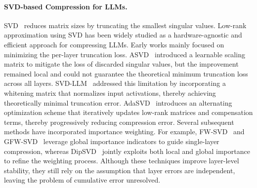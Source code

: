 \paragraph{SVD-based Compression for LLMs.}
SVD~\citep{Golub1987Generalization} reduces matrix sizes by truncating the smallest singular values. 
Low-rank approximation using SVD has been widely studied as a hardware-agnostic and efficient approach for compressing LLMs.
%
Early works mainly focused on minimizing the per-layer truncation loss.
ASVD~\citep{yuan2023asvd} introduced a learnable scaling matrix to mitigate the loss of discarded singular values, but the improvement remained local and could not guarantee the theoretical minimum truncation loss across all layers. SVD-LLM~\citep{Wang2024SVD-LLM,Wang2025SVD-LLM-V2} addressed this limitation by incorporating a whitening matrix that normalizes input activations, thereby achieving theoretically minimal truncation error. AdaSVD~\citep{li2025adasvd} introduces an alternating optimization scheme that iteratively updates low-rank matrices and compensation terms, thereby progressively reducing compression error. Several subsequent methods have incorporated importance weighting. For example, FW-SVD~\citep{Hsu2022FWSVD} and GFW-SVD~\citep{Chekalina2025GFWSVD} leverage global importance indicators to guide single-layer compression, whereas DipSVD~\citep{Ding2025DipSVD} jointly exploits both local and global importance to refine the weighting process.
%
Although these techniques improve layer-level stability, they still rely on the assumption that layer errors are independent, leaving the problem of cumulative error unresolved.
